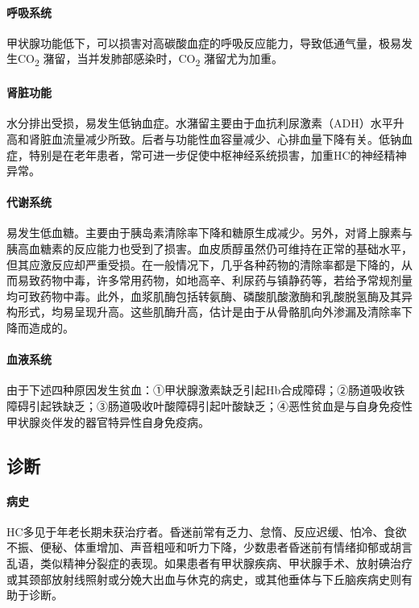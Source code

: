 \paragraph{呼吸系统}

甲状腺功能低下，可以损害对高碳酸血症的呼吸反应能力，导致低通气量，极易发生CO\textsubscript{2}
潴留，当并发肺部感染时，CO\textsubscript{2} 潴留尤为加重。

\paragraph{肾脏功能}

水分排出受损，易发生低钠血症。水潴留主要由于血抗利尿激素（ADH）水平升高和肾脏血流量减少所致。后者与功能性血容量减少、心排血量下降有关。低钠血症，特别是在老年患者，常可进一步促使中枢神经系统损害，加重HC的神经精神异常。

\paragraph{代谢系统}

易发生低血糖。主要由于胰岛素清除率下降和糖原生成减少。另外，对肾上腺素与胰高血糖素的反应能力也受到了损害。血皮质醇虽然仍可维持在正常的基础水平，但其应激反应却严重受损。在一般情况下，几乎各种药物的清除率都是下降的，从而易致药物中毒，许多常用药物，如地高辛、利尿药与镇静药等，若给予常规剂量均可致药物中毒。此外，血浆肌酶包括转氨酶、磷酸肌酸激酶和乳酸脱氢酶及其异构形式，均易呈现升高。这些肌酶升高，估计是由于从骨骼肌向外渗漏及清除率下降而造成的。

\paragraph{血液系统}

由于下述四种原因发生贫血：①甲状腺激素缺乏引起Hb合成障碍；②肠道吸收铁障碍引起铁缺乏；③肠道吸收叶酸障碍引起叶酸缺乏；④恶性贫血是与自身免疫性甲状腺炎伴发的器官特异性自身免疫病。

\subsection{诊断}

\paragraph{病史}

HC多见于年老长期未获治疗者。昏迷前常有乏力、怠惰、反应迟缓、怕冷、食欲不振、便秘、体重增加、声音粗哑和听力下降，少数患者昏迷前有情绪抑郁或胡言乱语，类似精神分裂症的表现。如果患者有甲状腺疾病、甲状腺手术、放射碘治疗或其颈部放射线照射或分娩大出血与休克的病史，或其他垂体与下丘脑疾病史则有助于诊断。


